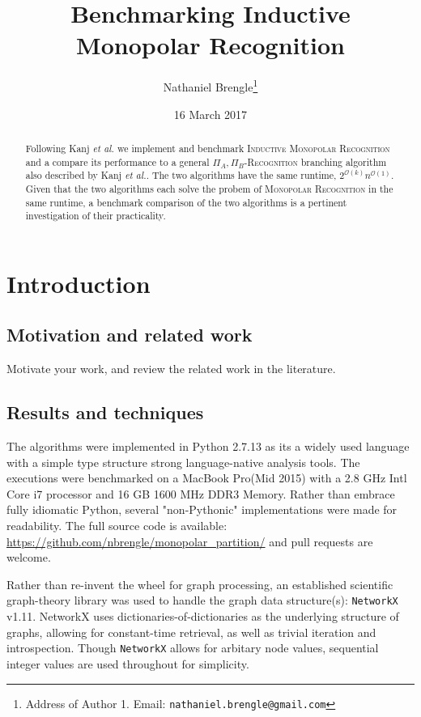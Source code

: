 \documentclass[11pt]{article}
\date{16 March 2017}
\title{Benchmarking Inductive Monopolar Recognition}
\author{{\sc Nathaniel Brengle}\thanks{Address of Author 1. Email: {\tt nathaniel.brengle@gmail.com}}}
\newcommand{\inlinecode}{\texttt}
\newcommand{\Oh}{{\mathcal O}}
\begin{document}
\maketitle

\begin{abstract}
Following Kanj \textit{et al.} \cite{ref1} we implement and benchmark \textsc{Inductive Monopolar Recognition} and a compare its performance to a general \textsc{$\Pi_A,$$\Pi_B$-Recognition} branching algorithm also described by Kanj \textit{et al.}. The two algorithms have the same runtime, $2^{\Oh(k)}n^{\Oh(1)}$. Given that the two algorithms each solve the probem of \textsc{Monopolar Recognition} in the same runtime, a benchmark comparison of the two algorithms is a pertinent investigation of their practicality.

\end{abstract}



\section{Introduction}
\label{sec:intro}

\subsection{Motivation and related work}
\label{subsec:motive}
Motivate your work, and review the related work in the literature.

\subsection{Results and techniques}
\label{subsec:results}
The algorithms were implemented in Python 2.7.13 as its a widely used language with a simple type structure strong language-native analysis tools. The executions were benchmarked on a MacBook Pro(Mid 2015) with a 2.8 GHz Intl Core i7 processor and 16 GB 1600 MHz DDR3 Memory. Rather than embrace fully idiomatic Python, several "non-Pythonic" implementations were made for readability. The full source code is available: \url{https://github.com/nbrengle/monopolar_partition/} and pull requests are welcome.

Rather than re-invent the wheel for graph processing, an established scientific graph-theory library was used to handle the graph data structure(s): \inlinecode{NetworkX} v1.11. NetworkX uses dictionaries-of-dictionaries as the underlying structure of graphs, allowing for constant-time retrieval, as well as trivial iteration and introspection. Though \inlinecode{NetworkX} allows for arbitary node values, sequential integer values are used throughout for simplicity.
\end{document}
